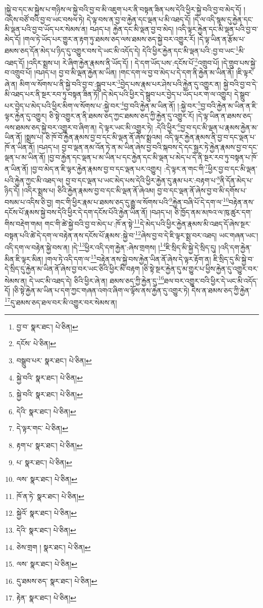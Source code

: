 །སྐྱེ་བ་དང་མ་སྐྱེས་པ་གཉིས་ལ་སྐྱེ་བའི་བྱ་བ་མི་འཇུག་པར་ནི་བསྟན་ཟིན་པས་དེའི་ཕྱིར་སྐྱེ་བའི་བྱ་བ་མེད་དོ། །འདིས་བཙོ་བའི་བྱ་བ་ཡང་བསལ་ཏེ། དེ་ལྟ་བས་ན་བྱ་བ་རྐྱེན་དང་ལྡན་པ་མི་འཐད་དོ། །དེ་ལ་འདི་སྙམ་དུ་རྐྱེན་དང་མི་ལྡན་པའི་བྱ་བ་ཡོད་པར་སེམས་ན། བཤད་པ། རྐྱེན་དང་མི་ལྡན་བྱ་བ་མེད། །འདི་ལྟར་རྐྱེན་དང་མི་ལྡན་པའི་བྱ་བ་མེད་དོ། །གལ་ཏེ་ཡོད་པར་གྱུར་ན་རྟག་ཏུ་ཐམས་ཅད་ལས་ཐམས་ཅད་སྐྱེ་བར་འགྱུར་རོ། །དེ་ལྟ་ཡིན་ན་རྩོམ་པ་ཐམས་ཅད་དོན་མེད་པ་ཉིད་དུ་འགྱུར་བས་དེ་ཡང་མི་འདོད་དེ། དེའི་ཕྱིར་རྐྱེན་དང་མི་ལྡན་པའི་:བྱ་བ་ཡང་\footnote{བྱ་བ་  སྣར་ཐང་།  པེ་ཅིན། }མི་འཐད་དོ། །འདིར་སྨྲས་པ། རེ་ཞིག་རྐྱེན་རྣམས་ནི་ཡོད་དོ། །
དེ་དག་ཡོད་པས་:དངོས་པོ་\footnote{དངོས་  པེ་ཅིན། }འགྲུབ་པོ། །དེ་གྲུབ་པས་སྐྱེ་བ་འགྲུབ་པོ། །བཤད་པ། བྱ་བ་མི་ལྡན་རྐྱེན་མ་ཡིན། །གང་དག་ལ་བྱ་བ་མེད་པ་དེ་དག་ནི་རྐྱེན་མ་ཡིན་ནོ། །ཇི་ལྟར་ཞེ་ན། མིག་ལ་སོགས་པ་ནི་སྐྱེ་བའི་བྱ་བ་:སྒྲུབ་པར་\footnote{བསྒྲུབ་པར་  སྣར་ཐང་།  པེ་ཅིན། }བྱེད་པས་རྣམ་པར་ཤེས་པའི་རྐྱེན་དུ་འགྱུར་ན། སྐྱེ་བའི་བྱ་བ་དེ་མི་འཐད་པར་ནི་སྔར་རབ་ཏུ་བསྟན་ཟིན་ཏོ། །དེ་མེད་པའི་ཕྱིར་དེ་སྒྲུབ་པར་བྱེད་པ་ཡོད་པར་ག་ལ་འགྱུར། དེ་སྒྲུབ་པར་བྱེད་པ་མེད་པའི་ཕྱིར་མིག་ལ་སོགས་པ་:སྐྱེ་བར་\footnote{སྐྱེ་བའི་  སྣར་ཐང་།  པེ་ཅིན། }བྱ་བའི་རྐྱེན་མ་ཡིན་ནོ། །:སྐྱེ་བར་\footnote{སྐྱེ་བའི་  སྣར་ཐང་།  པེ་ཅིན། }བྱ་བའི་རྐྱེན་མ་ཡིན་ན་ཇི་ལྟར་རྐྱེན་དུ་འགྱུར། ཅི་སྟེ་འགྱུར་ན་ནི་ཐམས་ཅད་ཀྱང་ཐམས་ཅད་ཀྱི་རྐྱེན་དུ་འགྱུར་རོ། །དེ་ལྟ་ཡིན་ན་ཐམས་ཅད་ལས་ཐམས་ཅད་སྐྱེ་བར་འགྱུར་བ་ཞིག་ན། དེ་ལྟར་ཡང་མི་འགྱུར་ཏེ། :དེའི་ཕྱིར་\footnote{དེའི་  སྣར་ཐང་།  པེ་ཅིན། }བྱ་བ་དང་མི་ལྡན་པ་རྣམས་རྐྱེན་མ་ཡིན་ནོ། །སྨྲས་པ། ཅི་ཁོ་བོ་རྐྱེན་རྣམས་བྱ་བ་དང་མི་ལྡན་ནོ་ཞེས་སྨྲའམ། འདི་ལྟར་རྐྱེན་རྣམས་ནི་བྱ་བ་དང་ལྡན་པ་ཁོ་ན་ཡིན་ནོ། །བཤད་པ། བྱ་བ་ལྡན་ནམ་འོན་ཏེ་ན་མ་ཡིན་ཞེས་བྱ་བའི་སྐབས་དེ་དང་སྦྱར་ཏེ་རྐྱེན་རྣམས་བྱ་བ་དང་ལྡན་པ་མ་ཡིན་ནོ། །བྱ་བ་རྐྱེན་དང་ལྡན་པ་མ་ཡིན་པ་དང་རྐྱེན་དང་མི་ལྡན་པ་མེད་པ་དེ་ནི་སྔར་རབ་ཏུ་བསྟན་པ་ཁོ་ན་ཡིན་ནོ། །བྱ་བ་མེད་ན་ཇི་ལྟར་རྐྱེན་རྣམས་བྱ་བ་དང་ལྡན་པར་འགྱུར། :དེ་ལྟར་ན་གང་གི་\footnote{དེ་ལྟར་གང་  པེ་ཅིན། }ཕྱིར་བྱ་བ་དང་མི་ལྡན་པའི་རྐྱེན་ཀྱང་མི་འཐད་ལ། བྱ་བ་དང་ལྡན་པ་ཡང་མེད་པས་དེའི་ཕྱིར་རྐྱེན་དུ་རྣམ་པར་:བརྟག་པ་\footnote{རྟག་པ་  སྣར་ཐང་།  པེ་ཅིན། }ནི་དོན་མེད་པ་ཉིད་དོ། །འདིར་སྨྲས་པ། ཅིའི་རྐྱེན་རྣམས་བྱ་བ་དང་མི་ལྡན་ནོ་ཞེའམ། བྱ་བ་དང་ལྡན་ནོ་ཞེས་བྱ་བ་མི་དགོས་པ་བསམ་པ་འདིས་ཅི་བྱ། གང་གི་ཕྱིར་རྣམ་པ་ཐམས་ཅད་དུ་རྒྱུ་ལ་སོགས་པའི་\footnote{པ་  སྣར་ཐང་།  པེ་ཅིན། }རྐྱེན་བཞི་པོ་དེ་དག་ལ་\footnote{ལས་  སྣར་ཐང་།  པེ་ཅིན། }བརྟེན་ནས་དངོས་པོ་རྣམས་སྐྱེ་བས་དེའི་ཕྱིར་དེ་དག་དངོས་པོའི་རྐྱེན་ཡིན་ནོ། །བཤད་པ། ཅི་ཁྱོད་ནམ་མཁའ་ལ་ཁུ་ཚུར་དག་གིས་བརྡེག་གམ། གང་གི་ཚེ་སྐྱེ་བའི་བྱ་བ་མེད་པ་:ཁོ་ན་སྟེ་\footnote{ཁོ་ན་ཏེ་  སྣར་ཐང་།  པེ་ཅིན། }དེ་མེད་པའི་ཕྱིར་རྐྱེན་རྣམས་མི་འཐད་དོ་ཞེས་སྔར་བསྟན་པའི་ཚེ་དེ་དག་ལ་བརྟེན་ནས་དངོས་པོ་རྣམས་:སྐྱེ་བ་\footnote{སྐྱེའོ་  སྣར་ཐང་།  པེ་ཅིན། }ཞེས་བྱ་བ་དེ་ཇི་ལྟར་སྨྲ་བར་འཐད། ཡང་གཞན་ཡང་། འདི་དག་ལ་བརྟེན་སྐྱེ་བས་ན། །དེ་\footnote{དེའི་  སྣར་ཐང་།  པེ་ཅིན། }ཕྱིར་འདི་དག་རྐྱེན་:ཞེས་གྲགས། །\footnote{ཅེས་གྲག །  སྣར་ཐང་།  པེ་ཅིན། }ཇི་སྲིད་མི་སྐྱེ་དེ་སྲིད་དུ། །འདི་དག་རྐྱེན་མིན་ཇི་ལྟར་མིན། །གལ་ཏེ་འདི་དག་ལ་\footnote{ལས་  སྣར་ཐང་།  པེ་ཅིན། }བརྟེན་ནས་སྐྱེ་བས་རྐྱེན་ཡིན་ནོ་ཞེས་དེ་ལྟར་རྟོག་ན། ཇི་སྲིད་དུ་མི་སྐྱེ་བ་དེ་སྲིད་དུ་རྐྱེན་མ་ཡིན་ནོ་ཞེས་བྱ་བར་ཡང་ཅིའི་ཕྱིར་མི་བརྟག །ཅི་སྟེ་སྔར་རྐྱེན་དུ་མ་གྱུར་པ་ཕྱིས་རྐྱེན་དུ་འགྱུར་བར་སེམས་ན། དེ་ཡང་མི་འཐད་དེ། ཅིའི་ཕྱིར་ཞེ་ན། ཐམས་ཅད་ཀྱི་རྐྱེན་དུ་\footnote{དུ་ཐམས་ཅད་  སྣར་ཐང་།  པེ་ཅིན། }ཐལ་བར་འགྱུར་བའི་ཕྱིར་དེ་ཡང་མི་འདོད་དོ། །ཅི་སྟེ་རྐྱེན་མ་ཡིན་པ་དག་ཀྱང་གཞན་འགའ་ཞིག་ལ་ལྟོས་ནས་རྐྱེན་དུ་འགྱུར་ཏེ། དེས་ན་ཐམས་ཅད་ཀྱི་རྐྱེན་\footnote{རྟེན་  སྣར་ཐང་།  པེ་ཅིན། }དུ་ཐམས་ཅད་ཐལ་བར་མི་འགྱུར་བར་སེམས་ན། 